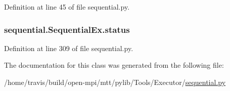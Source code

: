 Definition at line 45 of file sequential.\-py.

\hypertarget{classsequential_1_1_sequential_ex_a7f8ca8932ced5d9daf6191598894eb58}{
\subsubsection[{status}]{\setlength{\rightskip}{0pt plus 5cm}sequential.\-Sequential\-Ex.\-status}}\label{classsequential_1_1_sequential_ex_a7f8ca8932ced5d9daf6191598894eb58}


Definition at line 309 of file sequential.\-py.



The documentation for this class was generated from the following file\-:\begin{DoxyCompactItemize}
\item 
/home/travis/build/open-\/mpi/mtt/pylib/\-Tools/\-Executor/\hyperlink{sequential_8py}{sequential.\-py}\end{DoxyCompactItemize}
